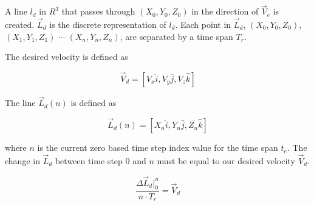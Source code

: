 A line $l_d$ in $R^3$ that passes through $(X_0, Y_0, Z_0)$ in the direction of $\vec{V}_e$ is created.  $\vec{L}_d$ is the discrete representation of $l_d$.  Each point in $\vec{L}_d$, $(X_0, Y_0, Z_0)$, $(X_1, Y_1, Z_1)$ $\cdots$ $(X_n, Y_n, Z_n)$, are separated by a time span $T_r$.


The desired velocity is defined as

\begin{equation}
\vec{V}_d = [V_x\hat{i}, V_y\hat{j}, V_z\hat{k}]
\end{equation}




The line $\vec{L}_d(n)$ is defined as

\begin{equation}
\vec{L}_d(n) = [X_n\hat{i}, Y_n\hat{j} , Z_n\hat{k}]
\end{equation}

where $n$ is the current zero based time step index value for the time span $t_e$.  The change in $\vec{L}_d$ between time step $0$ and $n$ must be equal to our desired velocity $\vec{V}_d$.


\begin{equation}
\frac{\Delta \vec{L}_d|_{0}^{n}}{n \cdot T_r} = \vec{V}_d
\end{equation}


